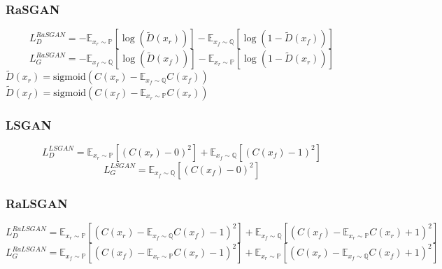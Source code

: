 \documentclass{article}
\begin{document}
\subsubsection{RaSGAN}

\begin{equation}
L_D^{RaSGAN} = -\mathbb{E}_{x_r \sim \mathbb{P}}\left[ \log\left( \tilde{D}(x_r) \right) \right] - \mathbb{E}_{x_f \sim \mathbb{Q}} \left[ \log \left( 1 - \tilde{D}(x_f) \right) \right]
\end{equation} 
\begin{equation}
L_G^{RaSGAN} = -\mathbb{E}_{x_f \sim \mathbb{Q}}\left[ \log\left( \tilde{D}(x_f) \right) \right] - \mathbb{E}_{x_r \sim \mathbb{P}} \left[ \log \left( 1 - \tilde{D}(x_r) \right) \right]
\end{equation}
$\tilde{D}(x_r)=\text{sigmoid} \left( C(x_r)-\mathbb{E}_{x_f \sim \mathbb{Q}} C(x_f) \right)$ \\ $ \tilde{D}(x_f)=\text{sigmoid} \left( C(x_f)-\mathbb{E}_{x_r \sim \mathbb{P}} C(x_r) \right)$

\subsubsection{LSGAN}

\begin{equation}
L_D^{LSGAN} = \mathbb{E}_{x_r \sim \mathbb{P}}\left[  (C(x_r)-0)^2 \right] + \mathbb{E}_{x_f \sim \mathbb{Q}} \left[ (C(x_f)-1)^2 \right]
\end{equation} 
\begin{equation}
L_G^{LSGAN} = \mathbb{E}_{x_f \sim \mathbb{Q}} \left[ (C(x_f)-0)^2 \right]
\end{equation}

\subsubsection{RaLSGAN}

\begin{equation}
L_D^{RaLSGAN} = \mathbb{E}_{x_r \sim \mathbb{P}}\left[  (C(x_r)-\mathbb{E}_{x_f \sim \mathbb{Q}} C(x_f)-1)^2 \right] + \mathbb{E}_{x_f \sim \mathbb{Q}} \left[ (C(x_f)-\mathbb{E}_{x_r \sim \mathbb{P}} C(x_r)+1)^2 \right]
\end{equation} 
\begin{equation}
L_G^{RaLSGAN} = \mathbb{E}_{x_f \sim \mathbb{P}}\left[  (C(x_f)-\mathbb{E}_{x_r \sim \mathbb{P}} C(x_r)-1)^2 \right] + \mathbb{E}_{x_r \sim \mathbb{P}} \left[ (C(x_r)-\mathbb{E}_{x_f \sim \mathbb{Q}} C(x_f)+1)^2 \right]
\end{equation}
\end{document}
